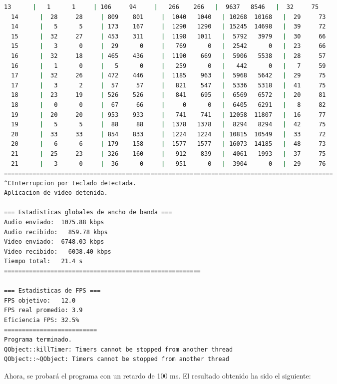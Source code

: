 \begin{adjustbox}{max width=\textwidth}
\begin{lstlisting}[language=bash,basicstyle=\ttfamily\scriptsize]
  13      |   1      1     | 106     94     |   266    266   |  9637   8546   |  32     75
  14      |  28     28     | 809    801     |  1040   1040   | 10268  10168   |  29     73
  14      |   5      5     | 173    167     |  1290   1290   | 15245  14698   |  39     72
  15      |  32     27     | 453    311     |  1198   1011   |  5792   3979   |  30     66
  15      |   3      0     |  29      0     |   769      0   |  2542      0   |  23     66
  16      |  32     18     | 465    436     |  1190    669   |  5906   5538   |  28     57
  16      |   1      0     |   5      0     |   259      0   |   442      0   |   7     59
  17      |  32     26     | 472    446     |  1185    963   |  5968   5642   |  29     75
  17      |   3      2     |  57     57     |   821    547   |  5336   5318   |  41     75
  18      |  23     19     | 526    526     |   841    695   |  6569   6572   |  20     81
  18      |   0      0     |  67     66     |     0      0   |  6405   6291   |   8     82
  19      |  20     20     | 953    933     |   741    741   | 12058  11807   |  16     77
  19      |   5      5     |  88     88     |  1378   1378   |  8294   8294   |  42     75
  20      |  33     33     | 854    833     |  1224   1224   | 10815  10549   |  33     72
  20      |   6      6     | 179    158     |  1577   1577   | 16073  14185   |  48     73
  21      |  25     23     | 326    160     |   912    839   |  4061   1993   |  37     75
  21      |   3      0     |  36      0     |   951      0   |  3904      0   |  29     76
============================================================================================
^CInterrupcion por teclado detectada.
Aplicacion de video detenida.

=== Estadisticas globales de ancho de banda ===
Audio enviado:	1075.88 kbps
Audio recibido:   859.78 kbps
Video enviado:	6748.03 kbps
Video recibido:   6038.40 kbps
Tiempo total: 	21.4 s
=======================================================

=== Estadisticas de FPS ===
FPS objetivo: 	12.0
FPS real promedio: 3.9
Eficiencia FPS:	32.5%
==========================
Programa terminado.
QObject::killTimer: Timers cannot be stopped from another thread
QObject::~QObject: Timers cannot be stopped from another thread
\end{lstlisting}
\end{adjustbox}
\vspace{\baselineskip}

Ahora, se probará el programa con un retardo de 100 ms. El resultado obtenido ha sido el siguiente:
\vspace{\baselineskip}

